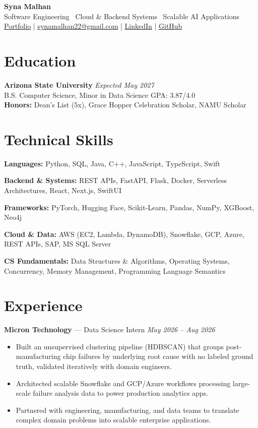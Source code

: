 \documentclass[a4paper,8pt]{extarticle}
\begin{document}
\begin{center}
{\Large \textbf{Syna Malhan}}\\
Software Engineering \textbullet\  Cloud \& Backend Systems \textbullet\  Scalable AI Applications\\
\href{https://synamalhan.github.io/website/}{Portfolio}
\;|\;
\href{mailto:synamalhan22@gmail.com}{synamalhan22@gmail.com}
\;|\;
\href{https://www.linkedin.com/in/synamalhan/}{LinkedIn}
\;|\;
\href{https://github.com/synamalhan}{GitHub}
\end{center}

\section*{Education}

\noindent
\textbf{Arizona State University} \hfill \textit{Expected May 2027}\\
\noindent
B.S. Computer Science, Minor in Data Science \hfill GPA: 3.87/4.0\\
\noindent
\textbf{Honors:} Dean's List (5x), Grace Hopper Celebration Scholar, NAMU Scholar

\section*{Technical Skills}

\noindent
\textbf{Languages:} Python, SQL, Java, C++, JavaScript, TypeScript, Swift

\noindent
\textbf{Backend \& Systems:} REST APIs, FastAPI, Flask, Docker, Serverless Architectures, React, Next.js, SwiftUI

\noindent
\textbf{Frameworks:} PyTorch, Hugging Face, Scikit-Learn, Pandas, NumPy, XGBoost, Neo4j

\noindent
\textbf{Cloud \& Data:} AWS (EC2, Lambda, DynamoDB), Snowflake, GCP, Azure, REST APIs, SAP, MS SQL Server

\noindent
\textbf{CS Fundamentals:} Data Structures \& Algorithms, Operating Systems, Concurrency, Memory Management, Programming Language Semantics

\section*{Experience}

\noindent
\textbf{Micron Technology} --- Data Science Intern
\hfill \textit{May 2026 -- Aug 2026}

\begin{itemize}
\item Built an unsupervised clustering pipeline (HDBSCAN) that groups post-manufacturing chip failures by underlying root cause with no labeled ground truth, validated iteratively with domain engineers.
\item Architected scalable Snowflake and GCP/Azure workflows processing large-scale failure analysis data to power production analytics apps.
\item Partnered with engineering, manufacturing, and data teams to translate complex domain problems into scalable enterprise applications.
\end{itemize}
\end{document}
